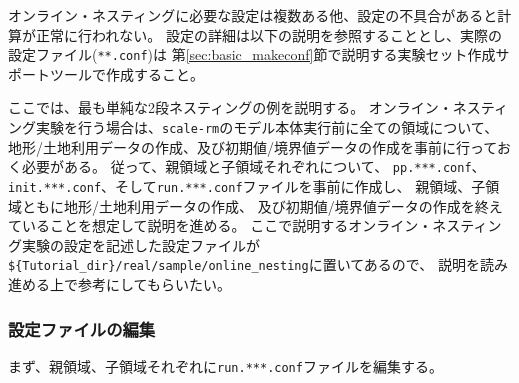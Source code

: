 オンライン・ネスティングに必要な設定は複数ある他、設定の不具合があると計算が正常に行われない。
設定の詳細は以下の説明を参照することとし、実際の設定ファイル(\verb|**.conf|)は
第\ref{sec:basic_makeconf}節で説明する実験セット作成サポートツールで作成すること。


ここでは、最も単純な2段ネスティングの例を説明する。
オンライン・ネスティング実験を行う場合は、\verb|scale-rm|のモデル本体実行前に全ての領域について、
地形/土地利用データの作成、及び初期値/境界値データの作成を事前に行っておく必要がある。
従って、親領域と子領域それぞれについて、
\verb|pp.***.conf|、\verb|init.***.conf|、そして\verb|run.***.conf|ファイルを事前に作成し、
親領域、子領域ともに地形/土地利用データの作成、
及び初期値/境界値データの作成を終えていることを想定して説明を進める。
ここで説明するオンライン・ネスティング実験の設定を記述した設定ファイルが
\verb|${Tutorial_dir}/real/sample/online_nesting|に置いてあるので、
説明を読み進める上で参考にしてもらいたい。


\subsubsection{設定ファイルの編集}
まず、親領域、子領域それぞれに\verb|run.***.conf|ファイルを編集する。

\\
{\small {\gt
{}}}\\

\vspace{0.5cm}

